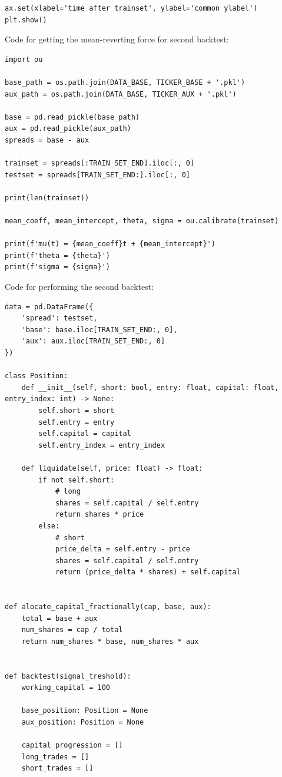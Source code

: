 \documentclass{article}
\begin{document}
\begin{spacing}{2.0}
\begin{lstlisting}
ax.set(xlabel='time after trainset', ylabel='common ylabel')
plt.show()
\end{lstlisting}

Code for getting the mean-reverting force for second backtest:

\begin{lstlisting}
import ou

base_path = os.path.join(DATA_BASE, TICKER_BASE + '.pkl')
aux_path = os.path.join(DATA_BASE, TICKER_AUX + '.pkl')

base = pd.read_pickle(base_path)
aux = pd.read_pickle(aux_path)
spreads = base - aux

trainset = spreads[:TRAIN_SET_END].iloc[:, 0]
testset = spreads[TRAIN_SET_END:].iloc[:, 0]

print(len(trainset))

mean_coeff, mean_intercept, theta, sigma = ou.calibrate(trainset)

print(f'mu(t) = {mean_coeff}t + {mean_intercept}')
print(f'theta = {theta}')
print(f'sigma = {sigma}')
\end{lstlisting}

Code for performing the second backtest:

\begin{lstlisting}
data = pd.DataFrame({
    'spread': testset,
    'base': base.iloc[TRAIN_SET_END:, 0],
    'aux': aux.iloc[TRAIN_SET_END:, 0]
})

class Position:
    def __init__(self, short: bool, entry: float, capital: float, entry_index: int) -> None:
        self.short = short
        self.entry = entry
        self.capital = capital
        self.entry_index = entry_index

    def liquidate(self, price: float) -> float:
        if not self.short:
            # long
            shares = self.capital / self.entry
            return shares * price
        else:
            # short
            price_delta = self.entry - price
            shares = self.capital / self.entry
            return (price_delta * shares) + self.capital


def alocate_capital_fractionally(cap, base, aux):
    total = base + aux
    num_shares = cap / total
    return num_shares * base, num_shares * aux


def backtest(signal_treshold):
    working_capital = 100

    base_position: Position = None
    aux_position: Position = None

    capital_progression = []
    long_trades = []
    short_trades = []


\end{lstlisting}
\end{spacing}
\end{document}
